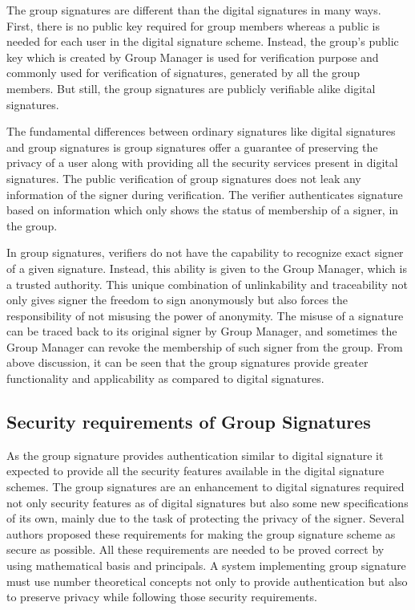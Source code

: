 The group signatures are different than the digital signatures in many ways. First, there is no public key required for group members whereas a public is needed for each user in the digital signature scheme. Instead, the group’s public key which is created by Group Manager is used for verification purpose and commonly used for verification of signatures, generated by all the group members. But still, the group signatures are publicly verifiable alike digital signatures.

The fundamental differences between ordinary signatures like digital signatures and group signatures is group signatures offer a guarantee of preserving the privacy of a user along with providing all the security services present in digital signatures. The public verification of group signatures does not leak any information of the signer during verification. The verifier authenticates signature based on information which only shows the status of membership of a signer, in the group. 

In group signatures, verifiers do not have the capability to recognize exact signer of a given signature. Instead, this ability is given to the Group Manager, which is a trusted authority. This unique combination of unlinkability and traceability not only gives signer the freedom to sign anonymously but also forces the responsibility of not misusing the power of anonymity. The misuse of a signature can be traced back to its original signer by   Group Manager, and sometimes the Group Manager can revoke the membership of such signer from the group. From above discussion, it can be seen that the group signatures provide greater functionality and applicability as compared to digital signatures.
\subsection{Security requirements of Group Signatures}
As the group signature provides authentication similar to digital signature it expected to provide all the security features available in the digital signature schemes. The group signatures are an enhancement to digital signatures required not only security features as of digital signatures but also some new specifications of its own, mainly due to the task of protecting the privacy of the signer. Several authors proposed these requirements for making the group signature scheme as secure as possible. All these requirements are needed to be proved correct by using mathematical basis and principals. A system implementing group signature must use number theoretical concepts not only to provide authentication but also to preserve privacy while following those security requirements. 
